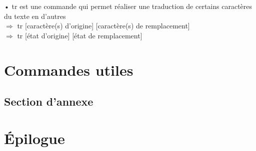 \documentclass[a4paper, 11pt, french, oneside]{book}
\begin{document}
• tr est une commande qui permet réaliser une traduction de certains caractères du texte en d’autres\\
$\Rightarrow$ tr [caractère(s) d’origine] [caractère(s) de remplacement]\\
$\Rightarrow$ tr [état d’origine] [état de remplacement]




 
   \appendix
   \chapter{Commandes utiles}
      \section{Section d'annexe}
    
   \backmatter
   
   \chapter{Épilogue}
\end{document}
